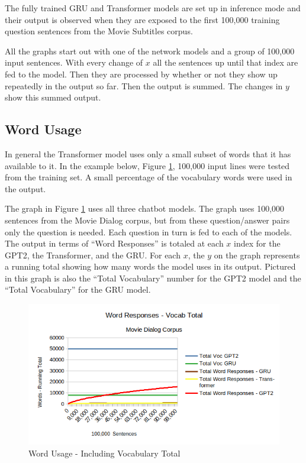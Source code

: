 The fully trained GRU and Transformer models are set up in inference mode and their output is observed when they are exposed to the first 100,000 training question sentences from the Movie Subtitles corpus.

All the graphs start out with one of the network models and a group of 100,000 input sentences. With every change of $x$ all the sentences up until that index are fed to the model. Then they are processed by whether or not they show up repeatedly in the output so far. Then the output is summed. The changes in $y$ show this summed output.

\subsection{Word Usage}

In general the Transformer model uses only a small subset of words that it has available to it. In the example below, Figure \ref{diagram-words-with-voc-total}, 100,000 input lines were tested from the training set. A small percentage of the vocabulary words were used in the output. %

The graph in Figure \ref{diagram-words-with-voc-total} uses all three chatbot models. The graph uses 100,000 sentences from the Movie Dialog corpus, but from these question/answer pairs only the question is needed. Each question in turn is fed to each of the models. The output in terms of ``Word Responses'' is totaled at each $x$ index for the GPT2, the Transformer, and the GRU. For each $x$, the $y$ on the graph represents a running total showing how many words the model uses in its output. Pictured in this graph is also the ``Total Vocabulary'' number for the GPT2 model and the ``Total Vocabulary'' for the GRU model.

\begin{figure}[H]
	\begin{center}
		\includegraphics[scale=0.75]{diagram-100000-vocab}
		
		
	\end{center}
	\caption[Word Usage]{Word Usage - Including Vocabulary Total}
	\label{diagram-words-with-voc-total}
	
\end{figure}

